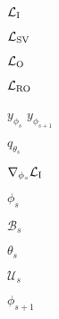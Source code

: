 $\mathcal{L}_{\rm I}$

$\mathcal{L}_{\rm SV}$

$\mathcal{L}_{\rm O}$

$\mathcal{L}_{\rm RO}$

$y_{\phi_s}$
$y_{\phi_{s+1}}$

$q_{\theta_s}$

$\nabla_{\phi_s}\mathcal{L}_{\rm I}$

$\phi_s$

$\mathcal{B}_s$

$\theta_s$

$\mathcal{U}_s$

$\phi_{s+1}$